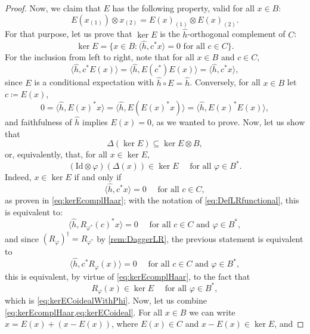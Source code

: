 \documentclass[a4paper,10pt]{amsart}
\newcommand{\eval}[2]{\langle #1 , #2\rangle}
\theoremstyle{definition}
\begin{document}
\begin{proof}
    \smallbreak\noindent
    Now, we claim that $E$ has the following property, valid for all $x\in B$:
    \begin{equation} \label{eq:colinearity}
        E(x_{(1)})\otimes x_{(2)}
        =
        E(x)_{(1)}\otimes E(x)_{(2)}.
    \end{equation}
    For that purpose, let us prove that $\ker E$ is the $\hat{h}$-orthogonal complement of $C$:
    \begin{equation}
        \label{eq:kerEcomplHaar}
        \ker E = \{ x\in B : \eval{\hat{h}}{c^* x} = 0 \text{ for all }c\in C\}.
    \end{equation}
    For the inclusion from left to right, note that for all $x\in B$ and $c\in C$,
    \[
        \eval{\hat{h}}{c^*E(x)}
        =
        \eval{\hat{h}}{E(c^*)E(x)}
        =
        \eval{\hat{h}}{c^*x},
    \]
    since $E$ is a conditional expectation with $\hat{h}\circ E = \hat{h}$. Conversely, for all $x\in B$ let $c \coloneqq E(x)$,
    \[
        0=\eval{\hat{h}}{E(x)^*x} = \eval{\hat{h}}{E(E(x)^*x)}=\eval{\hat{h}}{E(x)^*E(x)},
    \]
    and faithfulness of $\hat{h}$ implies $E(x)=0$, as we wanted to prove.
    Now, let us show that
    \begin{equation}
    \label{eq:kerECoideal}
        \Delta(\ker E) \subseteq \ker E \otimes B,
    \end{equation}
    or, equivalently, that, for all $x\in \ker E$,
    \begin{equation}
    \label{eq:kerECoidealWithPhi}
        (\mathrm{Id}\otimes \varphi)(\Delta(x)) \in\ker E
            \quad \text{ for all } \varphi\in B^*.
    \end{equation}
    Indeed, $x\in \ker E$ if and only if 
    \[
        \eval{\hat{h}}{c^*x} = 0
            \quad \text{ for all } c\in C,
    \]
    as proven in \cref{eq:kerEcomplHaar}; with the notation of \cref{eq:DefLRfunctional}, this is equivalent to:
    \[
        \eval{\hat{h}}{R_{\varphi^*}(c)^* x} = 0
            \quad \text{ for all }c\in C \text{ and }\varphi\in B^*,
    \]
    and since $(R_\varphi)^\dagger = R_{\varphi^*}$ by \cref{rem:DaggerLR}, the previous statement is equivalent to
    \[
        \eval{\hat{h}}{c^* R_{\varphi}(x)} = 0
            \quad \text{ for all }c\in C \text{ and }\varphi\in B^*,
    \]
    this is equivalent, by virtue of \cref{eq:kerEcomplHaar}, to the fact that
    \[
        R_{\varphi}(x) \in \ker E
            \quad \text{ for all } \varphi\in B^*,
    \]
    which is \cref{eq:kerECoidealWithPhi}.
    Now, let us combine \cref{eq:kerEcomplHaar,eq:kerECoideal}. For all $x\in B$ we can write $x = E(x) + (x-E(x))$, where $E(x)\in C$ and $x-E(x)\in \ker E$, and 

\end{proof}
\end{document}

